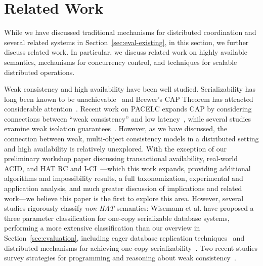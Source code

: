 
\section{Related Work}
\label{sec:relatedwork}

While we have discussed traditional mechanisms for distributed
coordination and several related systems in
Section~\ref{sec:eval-existing}, in this section, we further discuss
related work. In particular, we discuss related work on highly
available semantics, mechanisms for concurrency control, and
techniques for scalable distributed operations.

Weak consistency and high availability have been well
studied. Serializability has long been known to be
unachievable~\cite{davidson-survey} and Brewer's CAP Theorem has
attracted considerable attention~\cite{gilbert-cap}. Recent work on
PACELC expands CAP by considering connections between ``weak
consistency'' and low latency~\cite{abadi-pacelc}, while several
studies examine weak isolation guarantees~\cite{adya,
  ansicritique}. However, as we have discussed, the connection between
weak, multi-object consistency models in a distributed setting and
high availability is relatively unexplored. With the exception of our
preliminary workshop paper discussing transactional availability,
real-world ACID, and HAT RC and I-CI~\cite{hat-hotos}---which this
work expands, providing additional algorithms and impossibility
results, a full taxonomization, experimental and application analysis,
and much greater discussion of implications and related work---we
believe this paper is the first to explore this area. However, several
studies rigorously classify \textit{non-HAT} semantics: Wisemann et
al. have proposed a three parameter classification for one-copy
serializable database systems, performing a more extensive
classification than our overview in Section~\ref{sec:evaluation},
including eager database replication
techniques~\cite{kemme-classification} and distributed mechanisms for
achieving one-copy serializability~\cite{wisemann-survey}. Two recent
studies survey strategies for programming and reasoning about weak
consistency~\cite{bailis-ec, bernstein-survey}.


